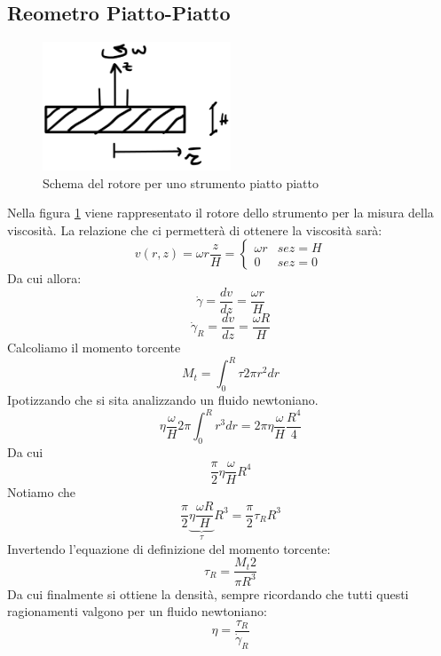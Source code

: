 \subsection{Reometro Piatto-Piatto}
\begin{figure}
\centering
\includegraphics[width = 0.5\textwidth]{gfx/PiattoPiatto}
\caption{Schema del rotore per uno strumento piatto piatto}
\label{fig:PiattoPiatto}
\end{figure}

Nella figura \ref{fig:PiattoPiatto} viene rappresentato il rotore dello strumento per la misura della viscosità.
La relazione che ci permetterà di ottenere la viscosità sarà:
\begin{equation}
v(r,z) = \omega r \frac{z}{H} =%
\begin{cases}
\omega r & se z = H\\
0 & se z = 0
\end{cases}
\end{equation}
Da cui allora:
\begin{equation}
\dot{\gamma} = \frac{dv}{dz} = \frac{\omega r}{H}
\end{equation}
\begin{equation}
\dot{\gamma}_R = \frac{dv}{dz} = \frac{\omega R}{H}
\end{equation}
Calcoliamo il momento torcente
\begin{equation}
M_t = \int_0^R{\tau 2\pi r^2 dr}
\end{equation}
Ipotizzando che si sita analizzando un fluido newtoniano.
\begin{equation}
\eta \frac{\omega}{H} 2\pi \int_0^R{r^3 dr} =%
2\pi \eta \frac{\omega}{H} \frac{R^4}{4}
\end{equation}
Da cui
\begin{equation}
\frac{\pi}{2} \eta \frac{\omega}{H} R^4
\end{equation}
Notiamo che
\begin{equation}
\frac{\pi}{2} \underbrace{\eta \frac{\omega R}{H}}_{\tau} R^3 = \frac{\pi}{2} \tau_R R^3
\end{equation}
Invertendo l'equazione di definizione del momento torcente:
\begin{equation}
\tau_R = \frac{M_t 2}{\pi R^3}
\end{equation}
Da cui finalmente si ottiene la densità, sempre ricordando che tutti questi ragionamenti valgono per un fluido newtoniano:
\begin{equation}
\eta = \frac{\tau_R}{\dot{\gamma}_R}
\end{equation}